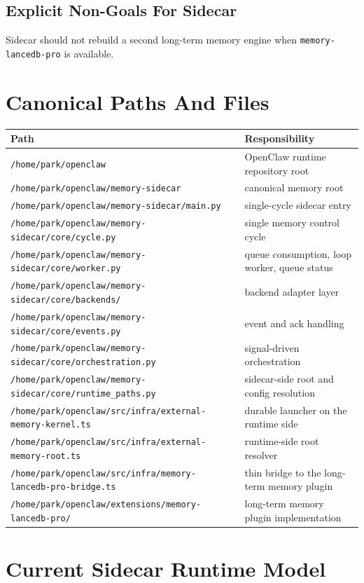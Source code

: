 \documentclass[11pt,a4paper,oneside,openany]{book}
\begin{document}
\section{Explicit Non-Goals For Sidecar}
Sidecar should not rebuild a second long-term memory engine when \texttt{memory-lancedb-pro} is available.
\chapter{Canonical Paths And Files}
\begin{longtable}{p{}p{}}
\toprule
\textbf{Path} & \textbf{Responsibility}\\
\midrule
\endhead
\texttt{/home/park/openclaw} & OpenClaw runtime repository root\\
\texttt{/home/park/openclaw/memory-sidecar} & canonical memory root\\
\texttt{/home/park/openclaw/memory-sidecar/main.py} & single-cycle sidecar entry\\
\texttt{/home/park/openclaw/memory-sidecar/core/cycle.py} & single memory control cycle\\
\texttt{/home/park/openclaw/memory-sidecar/core/worker.py} & queue consumption, loop worker, queue status\\
\texttt{/home/park/openclaw/memory-sidecar/core/backends/} & backend adapter layer\\
\texttt{/home/park/openclaw/memory-sidecar/core/events.py} & event and ack handling\\
\texttt{/home/park/openclaw/memory-sidecar/core/orchestration.py} & signal-driven orchestration\\
\texttt{/home/park/openclaw/memory-sidecar/core/runtime\_paths.py} & sidecar-side root and config resolution\\
\texttt{/home/park/openclaw/src/infra/external-memory-kernel.ts} & durable launcher on the runtime side\\
\texttt{/home/park/openclaw/src/infra/external-memory-root.ts} & runtime-side root resolver\\
\texttt{/home/park/openclaw/src/infra/memory-lancedb-pro-bridge.ts} & thin bridge to the long-term memory plugin\\
\texttt{/home/park/openclaw/extensions/memory-lancedb-pro/} & long-term memory plugin implementation\\
\bottomrule
\end{longtable}
\chapter{Current Sidecar Runtime Model}
\end{document}
